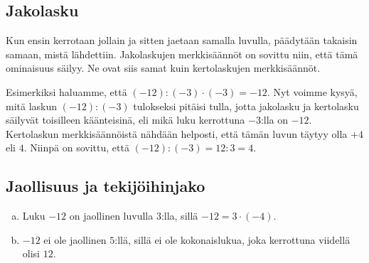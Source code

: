 \subsection*{Jakolasku}

        Kun ensin kerrotaan jollain ja sitten jaetaan samalla luvulla, päädytään takaisin samaan, mistä lähdettiin.  Jakolaskujen merkkisäännöt on sovittu niin, että tämä ominaisuus säilyy. Ne ovat siis samat kuin kertolaskujen merkkisäännöt.
    
    Esimerkiksi haluamme, että $(-12):(-3)\cdot (-3)=-12$. Nyt voimme kysyä, mitä laskun $(-12):(-3)$ tulokseksi pitäisi tulla, jotta jakolasku ja kertolasku säilyvät toisilleen käänteisinä, eli mikä luku kerrottuna $-3$:lla on $-12$. Kertolaskun merkkisäännöistä nähdään helposti, että tämän luvun täytyy olla $+4$ eli $4$. Niinpä on sovittu, että $(-12):(-3)=12:3=4$.



    \subsection*{Jaollisuus ja tekijöihinjako}

   
    
    \begin{esimerkki}
    \begin{enumerate}[a)]
    \item Luku $-12$ on jaollinen luvulla $3$:lla, sillä $-12 = 3 \cdot (-4)$.
    \item $-12$ ei ole jaollinen $5$:llä, sillä ei ole kokonaislukua, joka kerrottuna viidellä olisi $12$.
    \end{enumerate}
    \end{esimerkki}
    
